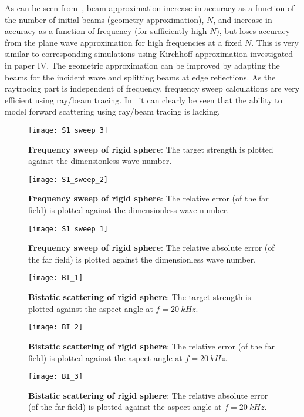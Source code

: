 As can be seen from~, beam approximation increase in accuracy as a function of the number of initial beams (geometry approximation), $N$, and increase in accuracy as a function of frequency (for sufficiently high $N$), but loses accuracy from the plane wave approximation for high frequencies at a fixed $N$. This is very similar to corresponding simulations using Kirchhoff approximation investigated in paper IV. The geometric approximation can be improved by adapting the beams for the incident wave and splitting beams at edge reflections. As the raytracing part is independent of frequency, frequency sweep calculations are very efficient using ray/beam tracing. In~ it can clearly be seen that the ability to model forward scattering using ray/beam tracing is lacking.
\begin{figure}
	\centering
	\texttt{[image: S1\_sweep\_3]}
	\caption{\textbf{Frequency sweep of rigid sphere}: The target strength is plotted against the dimensionless wave number.}
	\label{Fig:S1_sweep3}
\end{figure}
\begin{figure}
	\centering
	\texttt{[image: S1\_sweep\_2]}
	\caption{\textbf{Frequency sweep of rigid sphere}: The relative error (of the far field) is plotted against the dimensionless wave number.}
	\label{Fig:S1_sweep2}
\end{figure}
\begin{figure}
	\centering
	\texttt{[image: S1\_sweep\_1]}
	\caption{\textbf{Frequency sweep of rigid sphere}: The relative absolute error (of the far field) is plotted against the dimensionless wave number.}
	\label{Fig:S1_sweep1}
\end{figure}
\begin{figure}
	\centering
	\texttt{[image: BI\_1]}
	\caption{\textbf{Bistatic scattering of rigid sphere}: The target strength is plotted against the aspect angle at $f=\SI{20}{kHz}$.}
	\label{Fig:BI_1}
\end{figure}
\begin{figure}
	\centering
	\texttt{[image: BI\_2]}
	\caption{\textbf{Bistatic scattering of rigid sphere}: The relative error (of the far field) is plotted against the aspect angle at $f=\SI{20}{kHz}$.}
	\label{Fig:BI_2}
\end{figure}
\begin{figure}
	\centering
	\texttt{[image: BI\_3]}
	\caption{\textbf{Bistatic scattering of rigid sphere}: The relative absolute error (of the far field) is plotted against the aspect angle at $f=\SI{20}{kHz}$.}
	\label{Fig:BI_3}
\end{figure}


